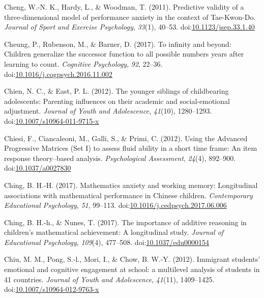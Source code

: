 \documentclass[english,man]{apa6}
\begin{document}
\hypertarget{ref-Cheng2011}{}
Cheng, W.-N. K., Hardy, L., \& Woodman, T. (2011). Predictive validity
of a three-dimensional model of performance anxiety in the context of
Tae-Kwon-Do. \emph{Journal of Sport and Exercise Psychology},
\emph{33}(1), 40--53.
doi:\href{https://doi.org/10.1123/jsep.33.1.40}{10.1123/jsep.33.1.40}

\hypertarget{ref-Cheung2017}{}
Cheung, P., Rubenson, M., \& Barner, D. (2017). To infinity and beyond:
Children generalize the successor function to all possible numbers years
after learning to count. \emph{Cognitive Psychology}, \emph{92}, 22--36.
doi:\href{https://doi.org/10.1016/j.cogpsych.2016.11.002}{10.1016/j.cogpsych.2016.11.002}

\hypertarget{ref-Chien2012}{}
Chien, N. C., \& East, P. L. (2012). The younger siblings of
childbearing adolescents: Parenting influences on their academic and
social-emotional adjustment. \emph{Journal of Youth and Adolescence},
\emph{41}(10), 1280--1293.
doi:\href{https://doi.org/10.1007/s10964-011-9715-x}{10.1007/s10964-011-9715-x}

\hypertarget{ref-Chiesi2012}{}
Chiesi, F., Ciancaleoni, M., Galli, S., \& Primi, C. (2012). Using the
Advanced Progressive Matrices (Set I) to assess fluid ability in a short
time frame: An item response theory--based analysis. \emph{Psychological
Assessment}, \emph{24}(4), 892--900.
doi:\href{https://doi.org/10.1037/a0027830}{10.1037/a0027830}

\hypertarget{ref-Ching2017}{}
Ching, B. H.-H. (2017). Mathematics anxiety and working memory:
Longitudinal associations with mathematical performance in Chinese
children. \emph{Contemporary Educational Psychology}, \emph{51},
99--113.
doi:\href{https://doi.org/10.1016/j.cedpsych.2017.06.006}{10.1016/j.cedpsych.2017.06.006}

\hypertarget{ref-Ching2017a}{}
Ching, B. H.-h., \& Nunes, T. (2017). The importance of additive
reasoning in children's mathematical achievement: A longitudinal study.
\emph{Journal of Educational Psychology}, \emph{109}(4), 477--508.
doi:\href{https://doi.org/10.1037/edu0000154}{10.1037/edu0000154}

\hypertarget{ref-Chiu2012}{}
Chiu, M. M., Pong, S.-l., Mori, I., \& Chow, B. W.-Y. (2012). Immigrant
students' emotional and cognitive engagement at school: a multilevel
analysis of students in 41 countries. \emph{Journal of Youth and
Adolescence}, \emph{41}(11), 1409--1425.
doi:\href{https://doi.org/10.1007/s10964-012-9763-x}{10.1007/s10964-012-9763-x}
\end{document}
